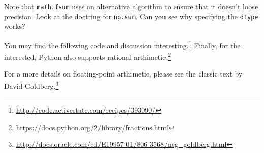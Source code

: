 \documentclass{article}
\begin{document}
\begin{enumerate}

Note that \texttt{math.fsum} uses an alternative algorithm to ensure that it
doesn't loose precision.  Look at the doctring for \texttt{np.sum}.  Can you
see why specifying the \texttt{dtype} works?

You may find the following code and discussion interesting.\footnote{
\url{http://code.activestate.com/recipes/393090/}}
Finally, for the interested, Python also supports rational arthimetic.\footnote{
\url{https://docs.python.org/2/library/fractions.html}}

For a more details on floating-point arthimetic, please see the classic text by
David
Goldberg.\footnote{\url{http://docs.oracle.com/cd/E19957-01/806-3568/ncg_goldberg.html}}

\end{enumerate}
\end{document}
